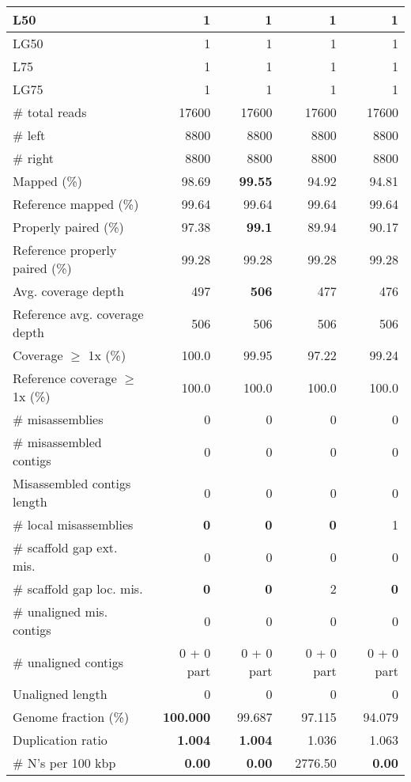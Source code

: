 \documentclass[12pt,a4paper]{article}
\begin{document}
\begin{table}[ht]
\begin{center}
\begin{tabular}{|l*{4}{|r}|}
L50 & 1 & 1 & 1 & 1 \\ \hline
LG50 & 1 & 1 & 1 & 1 \\ \hline
L75 & 1 & 1 & 1 & 1 \\ \hline
LG75 & 1 & 1 & 1 & 1 \\ \hline
\# total reads & 17600 & 17600 & 17600 & 17600 \\ \hline
\# left & 8800 & 8800 & 8800 & 8800 \\ \hline
\# right & 8800 & 8800 & 8800 & 8800 \\ \hline
Mapped (\%) & 98.69 & {\bf 99.55} & 94.92 & 94.81 \\ \hline
Reference mapped (\%) & 99.64 & 99.64 & 99.64 & 99.64 \\ \hline
Properly paired (\%) & 97.38 & {\bf 99.1} & 89.94 & 90.17 \\ \hline
Reference properly paired (\%) & 99.28 & 99.28 & 99.28 & 99.28 \\ \hline
Avg. coverage depth & 497 & {\bf 506} & 477 & 476 \\ \hline
Reference avg. coverage depth & 506 & 506 & 506 & 506 \\ \hline
Coverage $\geq$ 1x (\%) & 100.0 & 99.95 & 97.22 & 99.24 \\ \hline
Reference coverage $\geq$ 1x (\%) & 100.0 & 100.0 & 100.0 & 100.0 \\ \hline
\# misassemblies & 0 & 0 & 0 & 0 \\ \hline
\# misassembled contigs & 0 & 0 & 0 & 0 \\ \hline
Misassembled contigs length & 0 & 0 & 0 & 0 \\ \hline
\# local misassemblies & {\bf 0} & {\bf 0} & {\bf 0} & 1 \\ \hline
\# scaffold gap ext. mis. & 0 & 0 & 0 & 0 \\ \hline
\# scaffold gap loc. mis. & {\bf 0} & {\bf 0} & 2 & {\bf 0} \\ \hline
\# unaligned mis. contigs & 0 & 0 & 0 & 0 \\ \hline
\# unaligned contigs & 0 + 0 part & 0 + 0 part & 0 + 0 part & 0 + 0 part \\ \hline
Unaligned length & 0 & 0 & 0 & 0 \\ \hline
Genome fraction (\%) & {\bf 100.000} & 99.687 & 97.115 & 94.079 \\ \hline
Duplication ratio & {\bf 1.004} & {\bf 1.004} & 1.036 & 1.063 \\ \hline
\# N's per 100 kbp & {\bf 0.00} & {\bf 0.00} & 2776.50 & {\bf 0.00} \\ \hline

\end{tabular}
\end{center}
\end{table}
\end{document}

